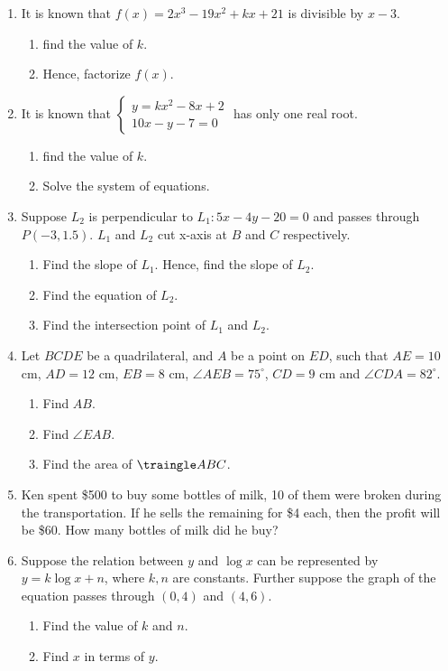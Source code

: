 \documentclass[12pt]{article}
\begin{document}
\begin{enumerate}
        \item It is known that $f(x)=2x^3-19x^2+kx+21$ is divisible by $x-3$.\begin{enumerate}
            \item find the value of $k$.
            \item Hence, factorize $f(x)$.
        \end{enumerate}
        \item It is known that $\begin{cases}
            y=kx^2-8x+2\\
            10x-y-7=0
        \end{cases}$ has only one real root.\begin{enumerate}
            \item find the value of $k$.
            \item Solve the system of equations.
        \end{enumerate}
        \item Suppose $L_2$ is perpendicular to $L_1:5x-4y-20=0$ and passes through $P(-3,1.5)$. $L_1$ and $L_2$ cut x-axis at $B$ and $C$ respectively.\begin{enumerate}
            \item Find the slope of $L_1$. Hence, find the slope of $L_2$.
            \item Find the equation of $L_2$.
            \item Find the intersection point of $L_1$ and $L_2$.
        \end{enumerate}
        \item Let $BCDE$ be a quadrilateral, and $A$ be a point on $ED$, such that $AE=10$ cm, $AD=12$ cm, $EB=8$ cm, $\angle AEB=75^\circ$, $CD=9$ cm and $\angle CDA=82^\circ$.\begin{enumerate}
            \item Find $AB$.
            \item Find $\angle EAB$.
            \item Find the area of $\traingle ABC$.
        \end{enumerate}
        \item Ken spent \$500 to buy some bottles of milk, 10 of them were broken during the transportation. If he sells the remaining for \$4 each, then the profit will be \$60. How many bottles of milk did he buy?
        \item Suppose the relation between $y$ and $\log{x}$ can be represented by $y=k\log{x}+n$, where $k,n$ are constants. Further suppose the graph of the equation passes through $(0,4)$ and $(4,6)$.\begin{enumerate}
            \item Find the value of $k$ and $n$.
            \item Find $x$ in terms of $y$.
        \end{enumerate}
    \end{enumerate}
\end{document}
